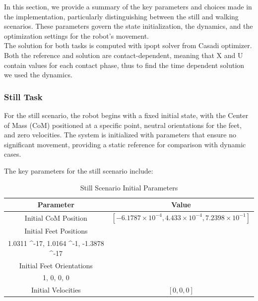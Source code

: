 \documentclass[main.tex]{subfiles}
\begin{document}
In this section, we provide a summary of the key parameters and choices made in the implementation, particularly distinguishing between the still and walking scenarios. These parameters govern the state initialization, the dynamics, and the optimization settings for the robot's movement.
\\The solution for both tasks is computed with ipopt solver from Casadi optimizer. Both the reference and solution are contact-dependent, meaning that X and U contain values for each contact phase, thus to find the time dependent solution we used the dynamics. 

\subsubsection*{Still Task}

For the still scenario, the robot begins with a fixed initial state, with the Center of Mass (CoM) positioned at a specific point, neutral orientations for the feet, and zero velocities. The system is initialized with parameters that ensure no significant movement, providing a static reference for comparison with dynamic cases. 

The key parameters for the still scenario include:

\begin{table}[htbp]
\centering
\renewcommand{\arraystretch}{1.5} %
\begin{tabular}{|c|c|}
\hline
\textbf{Parameter} & \textbf{Value} \\ \hline
Initial CoM Position & \([-6.1787 \times 10^{-4}, 4.433 \times 10^{-4}, 7.2398 \times 10^{-1}]\) \\ \hline
Initial Feet Positions & \(\left[\begin{matrix} 1.0311 \times 10^{-17}, -1.0164 \times 10^{-1}, -1.3878 \times 10^{-17} \\ 1.0311 \times 10^{-17}, 1.0164 \times 10^{-1}, -1.3878 \times 10^{-17} \end{matrix}\right]\) \\ \hline
Initial Feet Orientations & \(\left[\begin{matrix} 1, 0, 0, 0 \\ 1, 0, 0, 0 \end{matrix}\right]\) \\ \hline
Initial Velocities & \([0, 0, 0]\) \\ \hline
\end{tabular}
\caption{Still Scenario Initial Parameters}
\label{tab:still_parameters}
\end{table}
\end{document}
